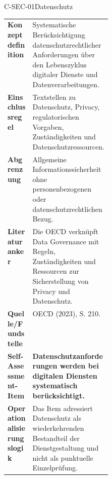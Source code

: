 \documentclass[10pt,a4paper]{article}
\begin{document}
\begin{codecard}{C-SEC-01}{Datenschutz}
\begin{tabularx}{\linewidth}{@{}>{\RaggedRight\arraybackslash\bfseries\color{DeepNavy}}p{0.245\linewidth}>{\RaggedRight\arraybackslash}X@{}}
Konzeptdefinition & Systematische Berücksichtigung datenschutzrechtlicher Anforderungen über den Lebenszyklus digitaler Dienste und Datenverarbeitungen. \\
\arrayrulecolor{SoftRule}\hline
Einschlussregel & Textstellen zu Datenschutz, Privacy, regulatorischen Vorgaben, Zuständigkeiten und Datenschutzressourcen. \\
\arrayrulecolor{SoftRule}\hline
Abgrenzung & Allgemeine Informationssicherheit ohne personenbezogenen oder datenschutzrechtlichen Bezug. \\
\arrayrulecolor{SoftRule}\hline
Literaturanker & Die OECD verknüpft Data Governance mit Regeln, Zuständigkeiten und Ressourcen zur Sicherstellung von Privacy und Datenschutz. \\
\arrayrulecolor{SoftRule}\hline
Quelle/Fundstelle & OECD (2023), S. 210. \\
\arrayrulecolor{SoftRule}\hline
Self-Assessment-Item & \textbf{Datenschutzanforderungen werden bei digitalen Diensten systematisch berücksichtigt.} \\
\arrayrulecolor{SoftRule}\hline
Operationalisierungslogik & Das Item adressiert Datenschutz als wiederkehrenden Bestandteil der Dienstgestaltung und nicht als punktuelle Einzelprüfung. \\
\end{tabularx}
\end{codecard}
\end{document}
